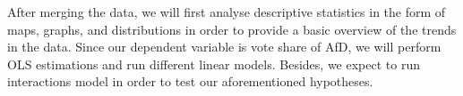 \documentclass[12pt, hidelinks]{article}
\begin{document}
After merging the data, we will first analyse descriptive statistics in the form of maps, graphs, and distributions in order to provide a basic overview of the trends in the data. Since our dependent variable is vote share of AfD, we will perform OLS estimations and run different linear models. Besides, we expect to run interactions model in order to test our aforementioned hypotheses.

\pagebreak

\end{document}
